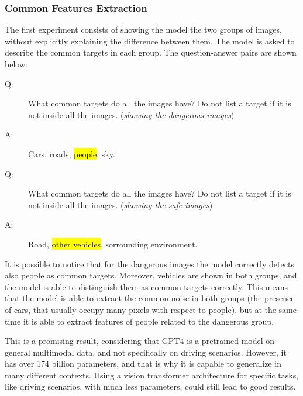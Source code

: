 \subsubsection{Common Features Extraction}
The first experiment consists of showing the model the two groups of images, 
without explicitly explaining the difference between them. The model is asked 
to describe the common targets in each group. The question-answer pairs are 
shown below:
%
{\selectfont
\begin{description}
    \item[Q:] What common targets do all the images have?
    Do not list a target if it is not inside all the images. 
    (\emph{showing the dangerous images})
    \item[A:] Cars, roads, \hl{people}, sky.
    \item[Q:] What common targets do all the images have?
    Do not list a target if it is not inside all the images. 
    (\emph{showing the safe images})
    \item[A:] Road, \hl{other vehicles}, sorrounding environment.    
\end{description}
}
It is possible to notice that for the dangerous images the model correctly 
detects also people as common targets. Moreover, vehicles are shown in both 
groups, and the model is able to distinguish them as common targets correctly.
This means that the model is able to extract the common noise in both groups 
(the presence of cars, that usually occupy many pixels with respect to people), 
but at the same time it is able to extract features of people related to the 
dangerous group.

This is a promising result, considering that GPT4 is a pretrained model on 
general multimodal data, and not specifically on driving scenarios. 
However, it has over 174 billion parameters, and that is why it is capable to 
generalize in many different contexts. Using a vision transformer architecture 
for specific tasks, like driving scenarios, with much less parameters, could 
still lead to good results.

